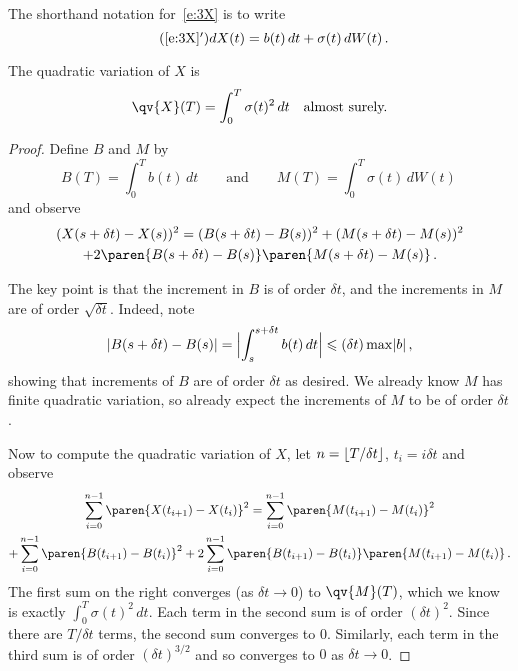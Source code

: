 \begin{remark}
  The shorthand notation for~\eqref{e:3X} is to write
  \begin{equation*}
    \tag{\ref{e:3X}$'$}
    dX(t) = b(t) \, dt + \sigma(t) \, dW(t)\,.
  \end{equation*}
\end{remark}

\begin{proposition}
  The quadratic variation of $X$ is
  \begin{equation}\label{e:3qvX}
    \qv{X}(T) = \int_0^T \sigma(t)^2 \, dt
    \quad\text{almost surely.}
  \end{equation}
\end{proposition}
\begin{proof}
  Define $B$ and $M$ by
  \begin{equation*}
    B(T) = \int_0^T b(t) \, dt
    \qquad\text{and}\qquad
    M(T) = \int_0^T \sigma(t) \, dW(t)\,
  \end{equation*}
  and observe
  \begin{multline}\label{e:3incX}
    (X(s + \delta t) - X(s))^2
      = (B(s+\delta t) - B(s))^2 
	+ (M( s + \delta t) - M(s))^2
	\\
	+ 2 \paren{ B(s + \delta t) - B(s) }
	    \paren{ M(s + \delta t) - M(s) }\,.
  \end{multline}

  The key point is that the increment in $B$ is of order $\delta t$, and the increments in $M$ are of order $\sqrt{\delta t}$.
  Indeed, note
  \begin{equation*}
    \abs{B(s + \delta t) - B(s)} = \abs[\Big]{ \int_s^{s + \delta t} b(t) \, dt}
      \leq (\delta t) \max \abs{b}\,,
  \end{equation*}
  showing that increments of $B$ are of order $\delta t$ as desired.
  We already know $M$ has finite quadratic variation, so already expect the increments of $M$ to be of order $\delta t$.

  Now to compute the quadratic variation of $X$, let $n = \floor{T / \delta t}$, $t_i = i \delta t$ and observe
  \begin{multline*}
    \sum_{i=0}^{n-1} \paren{ X(t_{i+1}) - X( t_i ) }^2
      = \sum_{i=0}^{n-1} \paren{ M(t_{i+1}) - M( t_i ) }^2
    \\
    \mathbin+ \sum_{i=0}^{n-1} \paren{ B(t_{i+1}) - B( t_i ) }^2
	+ 2\sum_{i=0}^{n-1}
	    \paren{ B(t_{i+1}) - B( t_i ) }
	    \paren{ M(t_{i+1}) - M( t_i ) }\,.
  \end{multline*}
  The first sum on the right converges (as $\delta t \to 0$) to $\qv{M}(T)$, which we know is exactly $\int_0^T \sigma(t)^2 \, dt$.
  Each term in the second sum is of order $(\delta t)^2$.
  Since there are $T / \delta t$ terms, the second sum converges to $0$.
  Similarly, each term in the third sum is of order $(\delta t)^{3/2}$ and so converges to $0$ as $\delta t \to 0$.
\end{proof}

